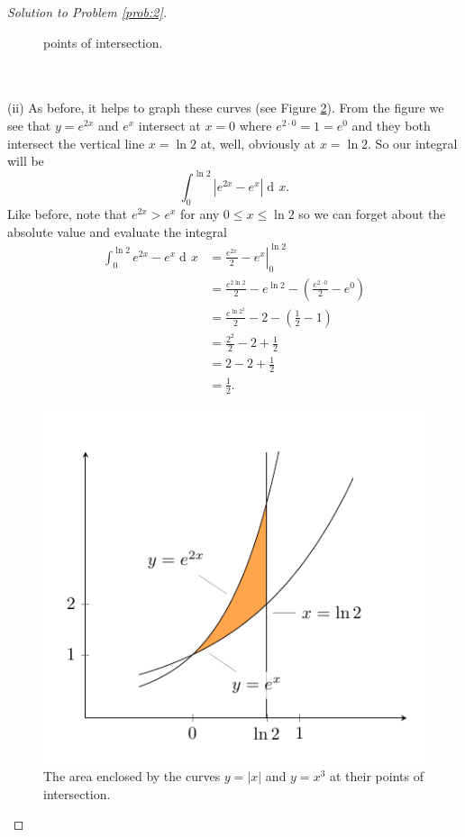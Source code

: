 \documentclass[12pt]{article}
\theoremstyle{plain}
\theoremstyle{definition}
\theoremstyle{remark}
\DeclareMathOperator{\diff}{d\!}
\begin{document}
\begin{proof}[Solution to Problem \ref{prob:2}]
\begin{figure}[h]
{ points of intersection.}
 \label{fig:area-1}
\end{figure}
\\\\
(ii) As before, it helps to graph these curves (see Figure
\ref{fig:area-2}). From the figure we see that $y=e^{2x}$ and $e^{x}$
intersect at $x=0$ where $e^{2\cdot 0}=1=e^0$ and they both intersect the
vertical line $x=\ln 2$ at, well, obviously at $x=\ln 2$. So our integral
will be
\[
\int_0^{\ln 2}\left|e^{2x}-e^x\right|\diff x.
\]
Like before, note that $e^{2x}>e^x$ for any $0\leq x\leq \ln 2$ so we can
forget about the absolute value and evaluate the integral
\begin{align*}
\int_0^{\ln 2}e^{2x}-e^x\diff x
&=\left.\frac{e^{2x}}{2}-e^x\right|_0^{\ln 2}\\
&=\frac{e^{2\ln 2}}{2}-e^{\ln 2}-\left(\frac{e^{2\cdot 0}}{2}-e^{0} \right)\\
&=\frac{e^{\ln 2^2}}{2}-2-\left(\frac{1}{2}-1\right)\\
&=\frac{2^2}{2}-2+\frac{1}{2}\\
&=2-2+\frac{1}{2}\\
&=\boxed{\frac{1}{2}.}
\end{align*}
\begin{figure}[h]
\centering
\includegraphics{../figures/quiz-3-2}
\caption{The area enclosed by the curves $y=|x|$ and $y=x^3$ at their
 points of intersection.}
 \label{fig:area-2}
\end{figure}
\end{proof}
\end{document}
